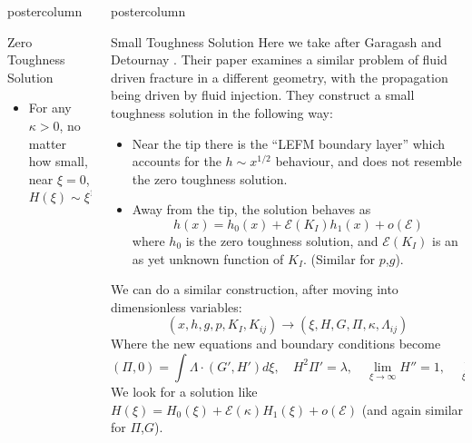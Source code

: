 \documentclass{beamer}
\newcommand{\cE}{\mathcal{E}}                               %
\newlength{\columnheight}
\begin{document}
\begin{frame}
\begin{columns}
\begin{column}{.43\textwidth}
\begin{beamercolorbox}[center]{postercolumn}
\begin{minipage}{.98\textwidth}
{\begin{myblock}{Zero Toughness Solution}
\begin{itemize}
\item For any $\kappa > 0$, no matter how small, near 
      $\xi=0$, $H(\xi)\sim \xi^{1/2}$
\end{itemize}
\end{myblock}\vfill
}\end{minipage}\end{beamercolorbox}
\end{column}
\begin{column}{.57\textwidth}
\begin{beamercolorbox}[center]{postercolumn}
\begin{minipage}{.98\textwidth} %
\parbox[t][\columnheight]{\textwidth}{ %
\begin{myblock}{Small Toughness Solution}
Here we take after Garagash and Detournay \cite{GandD}. Their paper examines
a similar problem of fluid driven fracture in a different geometry, with the
propagation being driven by fluid injection. They construct a small toughness
solution in the following way:
\begin{itemize}
\item Near the tip there is the ``LEFM boundary layer'' which accounts for the
      $h \sim x^{1/2}$ behaviour, and does not resemble the zero toughness 
     solution.
\item Away from the tip, the solution behaves as 
      \[h(x) = h_0(x) + \cE(K_I)h_1(x)+o(\cE)\]
      where $h_0$ is  the zero toughness solution, and $\cE(K_I)$ is an
      as yet unknown function of $K_I$. (Similar for $p$,$g$).
\end{itemize}
We can do a similar construction, after moving into dimensionless variables:
\[(x,h,g,p,K_I,K_{ij}) \to (\xi, H,G,\Pi, \kappa, \Lambda_{ij}) \]
Where the new equations and boundary conditions become
\[(\Pi,0) = \int \Lambda \cdot (G',H') d\xi, \quad H^2\Pi' = \lambda, \quad
\lim_{\xi \to \infty} H'' = 1, \quad \lim_{\xi \to 0} 3\sqrt{2\pi}H' = \kappa \]
We look for a solution like $H(\xi) = H_0(\xi) + \cE(\kappa)
H_1(\xi)+o(\cE)$ (and again similar for $\Pi$,$G$).
\begin{figure}
\begin{minipage}{.52\textwidth}

\end{minipage}
\end{figure}
\end{myblock}}
\end{minipage}
\end{beamercolorbox}
\end{column}
\end{columns}
\end{frame}
\end{document}
